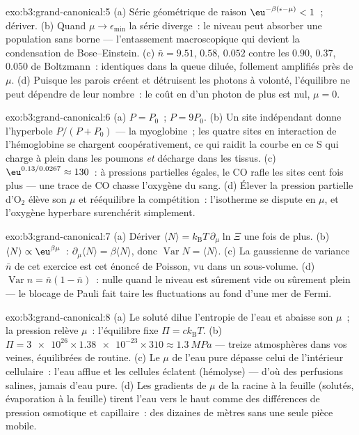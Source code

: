 \begin{solution}{exo:b3:grand-canonical:5}
(a) Série géométrique de raison $\eu^{-\beta(\epsilon-\mu)} < 1$~;
dériver. (b) Quand $\mu \to \epsilon_{\min}$ la série diverge~: le
niveau peut absorber une population sans borne --- l'entassement
macroscopique qui devient la condensation de Bose--Einstein. (c)
$\bar n = 9.51$, $0.58$, $0.052$ contre les $0.90$, $0.37$, $0.050$
de Boltzmann~: identiques dans la queue diluée, follement amplifiés
près de $\mu$. (d) Puisque les parois créent et détruisent les
photons à volonté, l'équilibre ne peut dépendre de leur nombre~: le
coût en  d'un photon de plus est nul, $\mu = 0$.
\end{solution}

\begin{solution}{exo:b3:grand-canonical:6}
(a) $P = P_0$~; $P = 9P_0$. (b) Un site indépendant donne
l'hyperbole $P/(P + P_0)$ --- la myoglobine~; les quatre sites en
interaction de l'hémoglobine se chargent coopérativement, ce qui
raidit la courbe en ce S qui charge à plein dans les poumons
\emph{et} décharge dans les tissus. (c) $\eu^{0.13/0.0267} \approx 130$~:
à pressions partielles égales, le CO rafle les sites cent fois plus --- une trace de CO chasse l'oxygène du sang. (d) Élever
la pression partielle d'O$_2$ élève son $\mu$ et rééquilibre la
compétition~: l'isotherme se dispute en $\mu$, et l'oxygène
hyperbare surenchérit simplement.
\end{solution}

\begin{solution}{exo:b3:grand-canonical:7}
(a) Dériver $\langle N\rangle = k_{\text{B}}T\,\partial_\mu
\ln\Xi$ une fois de plus. (b) $\langle N\rangle \propto
\eu^{\beta\mu}$~: $\partial_\mu\langle N\rangle = \beta\langle
N\rangle$, donc $\operatorname{Var}N = \langle N\rangle$. (c) La
gaussienne de variance $\bar n$ de cet exercice est cet énoncé de
Poisson, vu dans un sous-volume. (d) $\operatorname{Var}n =
\bar n(1 - \bar n)$~: nulle quand le niveau est sûrement vide ou
sûrement plein --- le blocage de Pauli fait taire les fluctuations
au fond d'une mer de Fermi.
\end{solution}

\begin{solution}{exo:b3:grand-canonical:8}
(a) Le soluté dilue l'entropie de l'eau et abaisse son $\mu$~; la
pression relève $\mu$~: l'équilibre fixe $\Pi = ck_{\text{B}}T$. (b) $\Pi =
\num{3e26} \times \num{1.38e-23} \times 310 \approx
\qty{1.3}{MPa}$ --- treize atmosphères dans vos veines,
équilibrées de routine. (c) Le $\mu$ de l'eau pure dépasse celui de
l'intérieur cellulaire~: l'eau afflue et les cellules éclatent
(hémolyse) --- d'où des perfusions salines, jamais d'eau pure. (d)
Les gradients de $\mu$ de la racine à la feuille (solutés,
évaporation à la feuille) tirent l'eau vers le haut comme des
différences de pression osmotique et capillaire~: des dizaines de
mètres sans une seule pièce mobile.
\end{solution}

